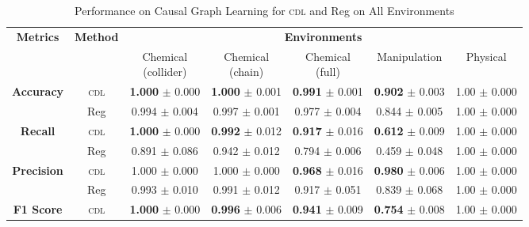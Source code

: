 \begin{table}
\centering
\caption{Performance on Causal Graph Learning for \textsc{cdl} and Reg on All Environments}
\vspace{-0pt}
\begin{small}
\begin{tabular}{ccccccc}
\toprule
\textbf{Metrics} & \textbf{Method}  & \multicolumn{5}{c}{\textbf{Environments}} \\
                 &                  & \thead{Chemical\\(collider)}  
                                    & \thead{Chemical\\(chain)}  
                                    & \thead{Chemical\\(full)}  
                                    & Manipulation  & Physical    \\
\midrule
\multirow{2}{*}{\textbf{Accuracy}}
& \textsc{cdl}                      & \textbf{1.000} $\pm$ 0.000   & \textbf{1.000} $\pm$ 0.001   & \textbf{0.991} $\pm$ 0.001   & \textbf{0.902} $\pm$ 0.003   & 1.00 $\pm$ 0.000   \\
& Reg                               & 0.994 $\pm$ 0.004            & 0.997 $\pm$ 0.001            & 0.977 $\pm$ 0.004            & 0.844 $\pm$ 0.005            & 1.00 $\pm$ 0.000   \\
\midrule
\multirow{2}{*}{\textbf{Recall}}
& \textsc{cdl}                      & \textbf{1.000} $\pm$ 0.000   & \textbf{0.992} $\pm$ 0.012   & \textbf{0.917} $\pm$ 0.016   & \textbf{0.612} $\pm$ 0.009   & 1.00 $\pm$ 0.000   \\
& Reg                               & 0.891 $\pm$ 0.086            & 0.942 $\pm$ 0.012            & 0.794 $\pm$ 0.006            & 0.459 $\pm$ 0.048            & 1.00 $\pm$ 0.000   \\
\midrule
\multirow{2}{*}{\textbf{Precision}}
& \textsc{cdl}                      & 1.000 $\pm$ 0.000            & 1.000 $\pm$ 0.000            & \textbf{0.968} $\pm$ 0.016   & \textbf{0.980} $\pm$ 0.006   & 1.00 $\pm$ 0.000   \\
& Reg                               & 0.993 $\pm$ 0.010            & 0.991 $\pm$ 0.012            & 0.917 $\pm$ 0.051            & 0.839 $\pm$ 0.068            & 1.00 $\pm$ 0.000   \\
\midrule
\multirow{2}{*}{\textbf{F1 Score}}
& \textsc{cdl}                      & \textbf{1.000} $\pm$ 0.000   & \textbf{0.996} $\pm$ 0.006   & \textbf{0.941} $\pm$ 0.009   & \textbf{0.754} $\pm$ 0.008   & 1.00 $\pm$ 0.000   \\

\end{tabular}
\end{small}
\end{table}
